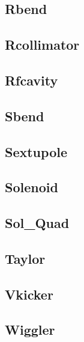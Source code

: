 \subsection{Rbend}
\label{s:rbend}

\subsection{Rcollimator}
\label{s:rcol}

\subsection{Rfcavity}
\label{s:rfcav}

\subsection{Sbend}
\label{s:sbend}

\subsection{Sextupole}
\label{s:sex}

\subsection{Solenoid}
\label{s:sol}

\subsection{Sol\_Quad}
\label{s:sq}

\subsection{Taylor}
\label{s:tay}

\subsection{Vkicker}
\label{s:vk}

\subsection{Wiggler} 
\label{s:wig}



